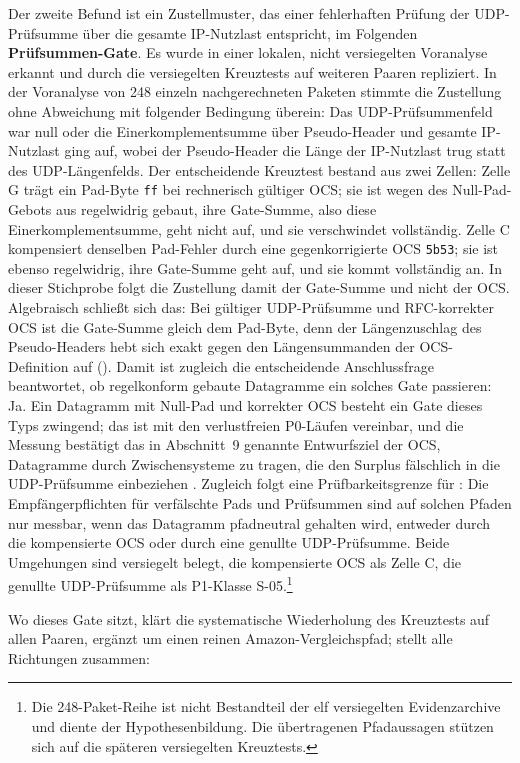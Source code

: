 Der zweite Befund ist ein Zustellmuster, das einer fehlerhaften Prüfung der UDP-Prüfsumme über die
gesamte IP-Nutzlast entspricht, im Folgenden \textbf{Prüfsummen-Gate}. Es wurde in einer lokalen, nicht
versiegelten Voranalyse erkannt und durch die versiegelten Kreuztests auf weiteren Paaren repliziert. In der
Voranalyse von 248 einzeln nachgerechneten Paketen stimmte die Zustellung ohne Abweichung mit
folgender Bedingung überein: Das UDP-Prüfsummenfeld war null oder die Einerkomplementsumme über
Pseudo-Header und gesamte IP-Nutzlast ging auf, wobei der Pseudo-Header die Länge der IP-Nutzlast trug
statt des UDP-Längenfelds. Der entscheidende Kreuztest bestand aus zwei Zellen: Zelle G
trägt ein Pad-Byte \texttt{ff} bei rechnerisch gültiger OCS; sie ist wegen des Null-Pad-Gebots aus
 regelwidrig gebaut, ihre Gate-Summe, also diese Einer\-komplement\-summe,
geht nicht auf, und sie verschwindet vollständig. Zelle C kompensiert denselben Pad-Fehler durch eine
gegenkorrigierte OCS \texttt{5b53}; sie ist ebenso regelwidrig, ihre Gate-Summe geht auf, und sie kommt
vollständig an. In dieser Stichprobe folgt die Zustellung damit der Gate-Summe und nicht der OCS.
Algebraisch schließt sich das: Bei gültiger UDP-Prüfsumme und RFC-korrekter OCS ist die Gate-Summe gleich
dem Pad-Byte, denn der Längenzuschlag des Pseudo-Headers hebt sich exakt gegen den Längensummanden der
OCS-Definition auf
(). Damit ist zugleich die entscheidende Anschlussfrage beantwortet, ob
regel\-konform gebaute Datagramme ein solches Gate passieren: Ja. Ein Datagramm mit Null-Pad und
korrekter OCS besteht ein Gate dieses Typs zwingend; das ist mit den verlustfreien P0-Läufen
vereinbar, und die Messung bestätigt das in Abschnitt~9 genannte Entwurfsziel der OCS, Datagramme durch
Zwischensysteme zu tragen, die den Surplus fälschlich in die UDP-Prüfsumme einbeziehen
\cite[Sec.~9]{rfc9868}. Zugleich folgt eine Prüfbarkeitsgrenze für : Die
Empfängerpflichten für verfälschte Pads und Prüfsummen sind auf solchen Pfaden nur messbar, wenn das
Datagramm pfadneutral gehalten wird, entweder durch die kompensierte OCS oder durch eine genullte
UDP-Prüfsumme. Beide Umgehungen sind versiegelt belegt, die
kompensierte OCS als Zelle C, die genullte UDP-Prüfsumme als P1-Klasse
S-05.\footnote{Die 248-Paket-Reihe ist nicht
Bestandteil der elf versiegelten Evidenzarchive und diente der Hypothesenbildung. Die übertragenen
Pfadaussagen stützen sich auf die späteren versiegelten Kreuztests.}

Wo dieses Gate sitzt, klärt die systematische Wiederholung des Kreuztests auf allen Paaren, ergänzt um
einen reinen Amazon-Vergleichspfad;  stellt alle Richtungen zusammen:

